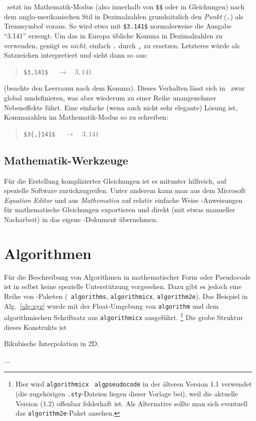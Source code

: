 \latex\ setzt im Mathematik-Modus (also innerhalb von \verb!$$! oder in Gleichungen) nach dem anglo-merikanischen Stil in Dezimalzahlen grundsätzlich den \emph{Punkt} (\verb!.!) als Trennsymbol voraus. So wird etwa mit \verb!$3.141$! normalerweise die Ausgabe "`3.141"' erzeugt. Um das in Europa übliche Komma in Dezimalzahlen zu verwenden, genügt es \emph{nicht}, einfach \verb!.! durch \verb!,! zu ersetzen. Letzteres würde als Satzzeichen interpretiert und sieht dann so aus:
\begin{quote}
\verb!$3,141$!	$\quad \rightarrow \quad 3,141$ 
\end{quote}
(beachte den Leerraum nach dem Komma). Dieses Verhalten lässt sich in \latex\ zwar global umdefinieren, was aber wiederum zu einer Reihe unangenehmer Nebeneffekte führt. Eine einfache (wenn auch nicht sehr elegante) Lösung ist, Kommazahlen im Mathematik-Modus so zu schreiben:
\begin{quote}
\verb!$3{,}141$!	$\quad \rightarrow \quad 3{,}141$
\end{quote}



\subsection{Mathematik-Werkzeuge}

Für die Erstellung komplizierter Gleichungen ist es mitunter
hilfreich, auf spezielle Software zurückzugreifen. Unter anderem kann man
aus dem Microsoft \emph{Equation Editor} und aus {\em
Mathematica} auf relativ einfache Weise \latex-An\-wei\-sun\-gen
für mathematische Gleichungen exportieren und direkt (mit etwas
manueller Nacharbeit) in das eigene \latex-Dokument übernehmen.


\section{Algorithmen}

Für die Beschreibung von Algorithmen in mathematischer Form oder
Pseudo\-code ist in \latex selbst keine spezielle Unterstützung vorgesehen.
Dazu gibt es jedoch eine Reihe von \latex-Paketen (\zB\ \texttt{algorithms}, 
\texttt{algorithmicx}, \texttt{algorithm2e}).
Das Beispiel in Alg.~\ref{alg:xyz} wurde mit der Float-Umgebung von \texttt{algorithm} und dem algorithmischen Schriftsatz aus \texttt{algorithmicx} ausgeführt.%
\footnote{Hier wird \texttt{algorithmicx} \bzw\ \texttt{algpseudocode} in der älteren Version 1.1 verwendet (die zugehörigen \texttt{.sty}-Dateien liegen dieser Vorlage bei), weil die aktuelle Version (1.2) offenbar fehlerhaft ist. Als Alternative sollte man sich eventuell das \texttt{algorithm2e}-Paket ansehen.}
Die grobe Struktur dieses Konstrukts ist
%
\begin{LaTeXCode}
\begin{algorithm}
\caption{Bikubische Interpolation in 2D.}
\label{alg:xyz}
\begin{algorithmic}[1] 
  ...
  \EndProcedure
\end{algorithmic}
\end{algorithm}
\end{LaTeXCode}

